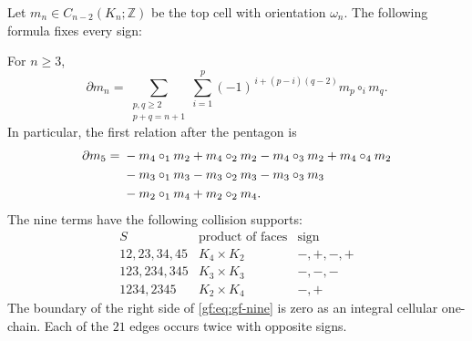 Let \(m_n\in C_{n-2}(K_n;\mathbb Z)\) be the top cell with
orientation \(\omega_n\).  The following formula fixes every sign:
\begin{theorem}\label{gf:thm:gf-boundary}
For \(n\geq3\),
\begin{equation}\label{gf:eq:gf-boundary}
 \partial m_n=
 \sum_{\substack{p,q\geq2\\p+q=n+1}}
 \sum_{i=1}^p
 (-1)^{\,i+(p-i)(q-2)}m_p\circ_i m_q.
\end{equation}
In particular, the first relation after the pentagon is
\begin{align}\label{gf:eq:gf-nine}
 \partial m_5={}&-m_4\circ_1m_2+m_4\circ_2m_2
                 -m_4\circ_3m_2+m_4\circ_4m_2\notag\\
 &-m_3\circ_1m_3-m_3\circ_2m_3-m_3\circ_3m_3\notag\\
 &-m_2\circ_1m_4+m_2\circ_2m_4.
\end{align}
The nine terms have the following collision supports:
\[
\begin{array}{c|c|c}
 S&\text{product of faces}&\text{sign}\\\hline
 12,23,34,45&K_4\times K_2&-,+,-,+\\
 123,234,345&K_3\times K_3&-,-,-\\
 1234,2345&K_2\times K_4&-,+
\end{array}
\]
The boundary of the right side of \eqref{gf:eq:gf-nine} is zero
as an integral cellular one-chain.  Each of the \(21\) edges
occurs twice with opposite signs.
\end{theorem}

